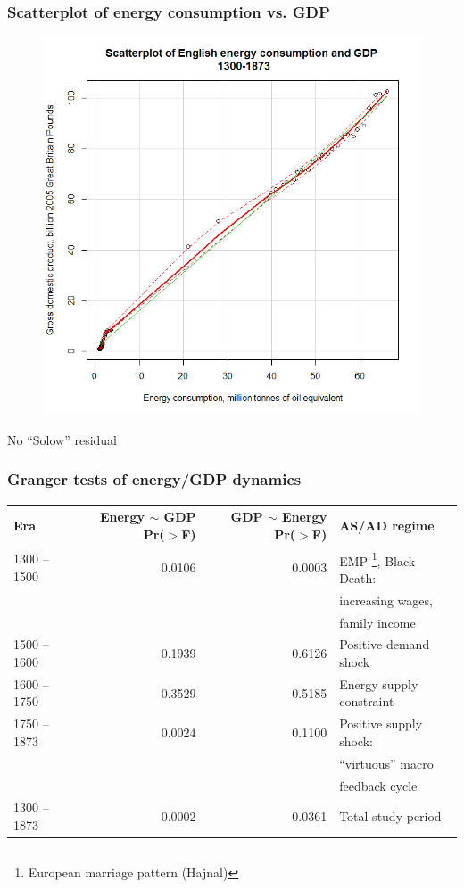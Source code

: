 \documentclass[final]{beamer}
\begin{document}
\begin{frame}
\frametitle{Scatterplot of energy consumption vs. GDP}
\begin{figure}[p!]
\center
\label{fig:scatterplot}
\includegraphics[height=0.8\textheight]{scatterplot.png}
\end{figure}
No ``Solow'' residual
\end{frame}

\begin{frame}
\frametitle{Granger tests of energy/GDP dynamics}
\scriptsize{
\begin{table}[p!]
\label{tbl:grangerEnergyGdp}
\begin{tabular}{lrrl}
Era&Energy $\sim$ GDP Pr($>$F)& GDP $\sim$ Energy Pr($>$F)&AS/AD regime\\
\hline \hline
1300 -- 1500&0.0106&0.0003&EMP \footnote{European marriage pattern (Hajnal)}, Black Death: \\&&&increasing wages, \\
&&&family income\\
1500 -- 1600&0.1939&0.6126&Positive demand shock\\
1600 -- 1750&0.3529&0.5185&Energy supply constraint\\
1750 -- 1873&0.0024&0.1100&Positive supply shock:\\&&&``virtuous'' macro \\
&&&feedback cycle\\
\hline
1300 -- 1873& 0.0002& 0.0361&Total study period\\
\end{tabular}
\end{table}
}
\end{frame}
\end{document}
